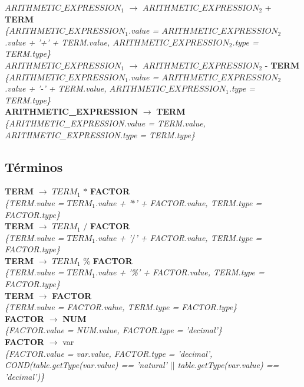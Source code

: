 \documentclass[10pt,a4paper]{article}
\begin{document}
\textbf{$ARITHMETIC\_EXPRESSION_1$} $\rightarrow$ \textbf{$ARITHMETIC\_EXPRESSION_2$} + \textbf{TERM} \\
\textit{\{$ARITHMETIC\_EXPRESSION_1$.value = $ARITHMETIC\_EXPRESSION_2$.value + '+' + TERM.value, $ARITHMETIC\_EXPRESSION_2$.type = TERM.type\}} \\

\textbf{$ARITHMETIC\_EXPRESSION_1$} $\rightarrow$ \textbf{$ARITHMETIC\_EXPRESSION_2$} - \textbf{TERM}  \\
\textit{\{$ARITHMETIC\_EXPRESSION_1$.value = $ARITHMETIC\_EXPRESSION_2$.value + '-' + TERM.value, $ARITHMETIC\_EXPRESSION_1$.type = TERM.type\}} \\

\textbf{ARITHMETIC\_EXPRESSION} $\rightarrow$ \textbf{TERM} \\
\textit{\{ARITHMETIC\_EXPRESSION.value = TERM.value, ARITHMETIC\_EXPRESSION.type = TERM.type\}}  \\

\subsection{Términos}
\textbf{TERM} $\rightarrow$ \textbf{$TERM_{1}$} $*$ \textbf{FACTOR}   \\
\textit{\{TERM.value = $TERM_{1}$.value + '$*$' + FACTOR.value, TERM.type = FACTOR.type\}} \\

\textbf{TERM} $\rightarrow$ \textbf{$TERM_{1}$} $/$ \textbf{FACTOR}   \\
\textit{\{TERM.value = $TERM_{1}$.value + '$/$' + FACTOR.value, TERM.type = FACTOR.type\}} \\

\textbf{TERM} $\rightarrow$ \textbf{$TERM_{1}$} \% \textbf{FACTOR}  \\
\textit{\{TERM.value = $TERM_{1}$.value + '\%' + FACTOR.value, TERM.type = FACTOR.type\}} \\

\textbf{TERM} $\rightarrow$ \textbf{FACTOR} \\
\textit{\{TERM.value = FACTOR.value, TERM.type = FACTOR.type\}} \\

\textbf{FACTOR} $\rightarrow$ \textbf{NUM}   \\
\textit{\{FACTOR.value = NUM.value, FACTOR.type = 'decimal'\}} \\

\textbf{FACTOR} $\rightarrow$ var  \\ 
\textit{\{FACTOR.value = var.value, FACTOR.type = 'decimal', COND(table.getType(var.value) == 'natural' $||$ table.getType(var.value) == 'decimal')\}}  \\ 
\\
\end{document}
